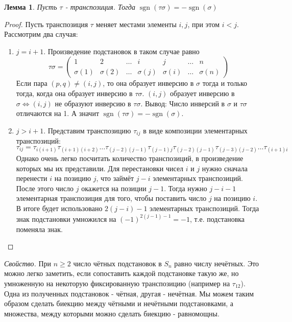 \documentclass[a4paper, 12pt]{article}
\DeclareMathOperator{\sgn}{sgn}
\newtheorem*{lemma}{Лемма}
\begin{document}
\begin{lemma} 
    Пусть $\tau$ - транспозиция. Тогда $\sgn(\tau\sigma) = - \sgn(\sigma)$
\end{lemma}
\begin{proof}
Пусть транспозиция $\tau$ меняет местами элементы $i,j$, при этом $i<j$. Рассмотрим два случая:
\begin{enumerate}
\item $j = i + 1$. Произведение подстановок в таком случае равно 
\[\tau \sigma = \begin{pmatrix}
1 & 2 & \dots & i & j & \dots & n \\
\sigma(1) & \sigma(2) & \dots & \sigma(j) & \sigma(i) & \dots & \sigma(n) 
\end{pmatrix}\] 
Если пара $(p, q) \neq (i, j)$, то она  образует инверсию в $\sigma$ тогда и только тогда, когда она образует инверсию в $\tau \sigma$. $(i, j)$ образует инверсию в $\sigma \Leftrightarrow (i, j)$ не образуют инверсию в $\tau\sigma$.
Вывод: Число инверсий в $\sigma$ и $\tau \sigma$ отличаются на 1. А значит  $\sgn(\tau \sigma) = -\sgn(\sigma)$.

\item $j > i + 1$. Представим транспозицию $\tau_{ij}$ в виде композиции элементарных транспозиций: \[\tau_{ij} = \tau_{i(i+1)} \tau_{(i+1)(i+2)} \ldots \tau_{(j-2)(j-1)} \tau_{(j-1)j} \tau_{(j-2)(j-1)} \tau_{(j-3)(j-2)} \ldots \tau_{(i+1)i}\]
Однако очень легко посчитать количество транспозиций, в произведение которых мы их представили. Для перестановки чисел $i$ и $j$ нужно сначала перенести $i$ на позицию $j$, что займёт $j - i$ элементарных транспозиций. После этого число $j$ окажется на позиции $j - 1$. Тогда нужно $j - i - 1$ элементарная транспозиция для того, чтобы поставить число $j$ на позицию $i$. В итоге будет использовано $2(j - i) - 1$ элементарных транспозиций. Тогда знак подстановки умножился на $(-1)^{2(j-1) - 1} = -1$, т.е. подстановка поменяла знак.
\end{enumerate}
\end{proof}
\textit{Свойство.} При $n \geqslant 2$ число чётных подстановок в $S_n$ равно числу нечётных. Это можно легко заметить, если сопоставить каждой подстановке такую же, но умноженную на некоторую фиксированную транспозицию (например на $\tau_{12}$). Одна из полученных подстановок - чётная, другая - нечётная. Мы можем таким образом сделать биекцию между чётными и нечётными подстановками, а множества, между которыми можно сделать биекцию - равномощны.

\end{document}
